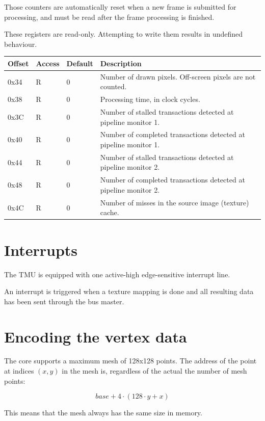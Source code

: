 \documentclass[a4paper,11pt]{article}
\begin{document}
Those counters are automatically reset when a new frame is submitted for processing, and must be read after the frame processing is finished.

These registers are read-only. Attempting to write them results in undefined behaviour.

\begin{tabularx}{\textwidth}{|l|l|l|X|}
\hline
\bf{Offset} & \bf{Access} & \bf{Default} & \bf{Description} \\
\hline
0x34 & R & 0 & Number of drawn pixels. Off-screen pixels are not counted. \\
\hline
0x38 & R & 0 & Processing time, in clock cycles. \\
\hline
0x3C & R & 0 & Number of stalled transactions detected at pipeline monitor 1. \\
\hline
0x40 & R & 0 & Number of completed transactions detected at pipeline monitor 1. \\
\hline
0x44 & R & 0 & Number of stalled transactions detected at pipeline monitor 2. \\
\hline
0x48 & R & 0 & Number of completed transactions detected at pipeline monitor 2. \\
\hline
0x4C & R & 0 & Number of misses in the source image (texture) cache. \\
\hline
\end{tabularx}

\section{Interrupts}
The TMU is equipped with one active-high edge-sensitive interrupt line.

An interrupt is triggered when a texture mapping is done and all resulting data has been sent through the bus master.

\section{Encoding the vertex data}
The core supports a maximum mesh of 128x128 points. The address of the point at indices $ (x, y) $ in the mesh is, regardless of the actual the number of mesh points:

\begin{equation*}
base + 4 \cdot (128 \cdot y + x)
\end{equation*}

This means that the mesh always has the same size in memory.
\end{document}
